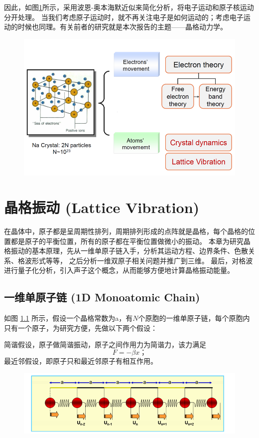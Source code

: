 \documentclass[declarePage]{ecnuthesis}
\begin{document}
因此，如图\ref{BOA}所示，采用波恩-奥本海默近似来简化分析，将电子运动和原子核运动分开处理。%
当我们考虑原子运动时，就不再关注电子是如何运动的；考虑电子运动的时候也同理。有关前者的研究就是本次报告的主题——晶格动力学。
\begin{figure}[htb]
    \centering
    \includegraphics[width=.7\textwidth]{BOA.png}
    \label{BOA}
\end{figure}

\chapter{晶格振动 (Lattice Vibration)}

在晶体中，原子都是呈周期性排列，周期排列形成的点阵就是晶格，每个晶格的位置都是原子的平衡位置，所有的原子都在平衡位置做微小的振动。%
本章为研究晶格振动的基本原理，先从一维单原子链入手，分析其运动方程、边界条件、色散关系、格波形式等等，%
之后分析一维双原子相关问题并推广到三维。%
最后，对格波进行量子化分析，引入声子这个概念，从而能够方便地计算晶格振动能量。

\section{一维单原子链 (1D Monoatomic Chain)}

如图 \ref{1DMC} 所示，假设一个晶格常数为a，有$N$个原胞的一维单原子链，每个原胞内只有一个原子，为研究方便，先做以下两个假设：

简谐假设，原子做简谐振动，原子之间作用力为简谐力，该力满足
\begin{equation}
    F = - \beta x \text{；}
\end{equation}
最近邻假设，即原子只和最近邻原子有相互作用。
\begin{figure}[htb]
    \centering
    \includegraphics[width=.7\textwidth]{1DMC.png}
    \label{1DMC}
\end{figure}
\end{document}
